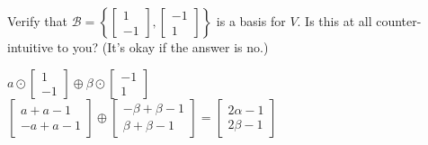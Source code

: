 		\item Verify that 
		$\mathcal{B} = \left\lbrace
		\begin{bmatrix} 1 \\ -1 \end{bmatrix},
		\begin{bmatrix} -1 \\ 1 \end{bmatrix}\right\rbrace$ is a basis for $V$. 
		Is this at all counter-intuitive to you? (It's okay if the answer is no.)
		
		\begin{solution}
            $a \odot \begin{bmatrix} 1 \\ -1 \end{bmatrix} \oplus \beta \odot \begin{bmatrix} -1 \\ 1 \end{bmatrix}$
            \\
            $\begin{bmatrix} a + a-1 \\ -a + a -1 \end{bmatrix} \oplus 
            \begin{bmatrix} -\beta + \beta -1 \\ \beta + \beta -1 \end{bmatrix} = 
            \begin{bmatrix}2 \alpha-1 \\ 2 \beta -1 \end{bmatrix}$
            

\end{solution}
